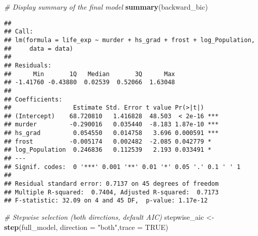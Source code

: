 \documentclass[
]{article}
\newenvironment{Shaded}{\begin{snugshade}}{\end{snugshade}}
\newcommand{\AttributeTok}[1]{\textcolor[rgb]{0.13,0.29,0.53}{#1}}
\newcommand{\CommentTok}[1]{\textcolor[rgb]{0.56,0.35,0.01}{\textit{#1}}}
\newcommand{\ConstantTok}[1]{\textcolor[rgb]{0.56,0.35,0.01}{#1}}
\newcommand{\FunctionTok}[1]{\textcolor[rgb]{0.13,0.29,0.53}{\textbf{#1}}}
\newcommand{\NormalTok}[1]{#1}
\newcommand{\OtherTok}[1]{\textcolor[rgb]{0.56,0.35,0.01}{#1}}
\newcommand{\StringTok}[1]{\textcolor[rgb]{0.31,0.60,0.02}{#1}}
\begin{document}
\begin{Shaded}
\begin{Highlighting}[]
\CommentTok{\# Display summary of the final model}
\FunctionTok{summary}\NormalTok{(backward\_bic)}
\end{Highlighting}
\end{Shaded}

\begin{verbatim}
## 
## Call:
## lm(formula = life_exp ~ murder + hs_grad + frost + log_Population, 
##     data = data)
## 
## Residuals:
##      Min       1Q   Median       3Q      Max 
## -1.41760 -0.43880  0.02539  0.52066  1.63048 
## 
## Coefficients:
##                 Estimate Std. Error t value Pr(>|t|)    
## (Intercept)    68.720810   1.416828  48.503  < 2e-16 ***
## murder         -0.290016   0.035440  -8.183 1.87e-10 ***
## hs_grad         0.054550   0.014758   3.696 0.000591 ***
## frost          -0.005174   0.002482  -2.085 0.042779 *  
## log_Population  0.246836   0.112539   2.193 0.033491 *  
## ---
## Signif. codes:  0 '***' 0.001 '**' 0.01 '*' 0.05 '.' 0.1 ' ' 1
## 
## Residual standard error: 0.7137 on 45 degrees of freedom
## Multiple R-squared:  0.7404, Adjusted R-squared:  0.7173 
## F-statistic: 32.09 on 4 and 45 DF,  p-value: 1.17e-12
\end{verbatim}

\begin{Shaded}
\begin{Highlighting}[]
\CommentTok{\# Stepwise selection (both directions, default AIC)}
\NormalTok{stepwise\_aic }\OtherTok{\textless{}{-}} \FunctionTok{step}\NormalTok{(full\_model, }
                     \AttributeTok{direction =} \StringTok{"both"}\NormalTok{,}\AttributeTok{trace =} \ConstantTok{TRUE}\NormalTok{)}
\end{Highlighting}
\end{Shaded}
\end{document}
